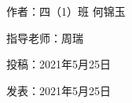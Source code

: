 \vspace{10pt}



作者：四（1）班 何锦玉



指导老师：周瑞



投稿：2021年5月25日



发表：2021年5月25日
















                



\vspace{10pt}

\hline



